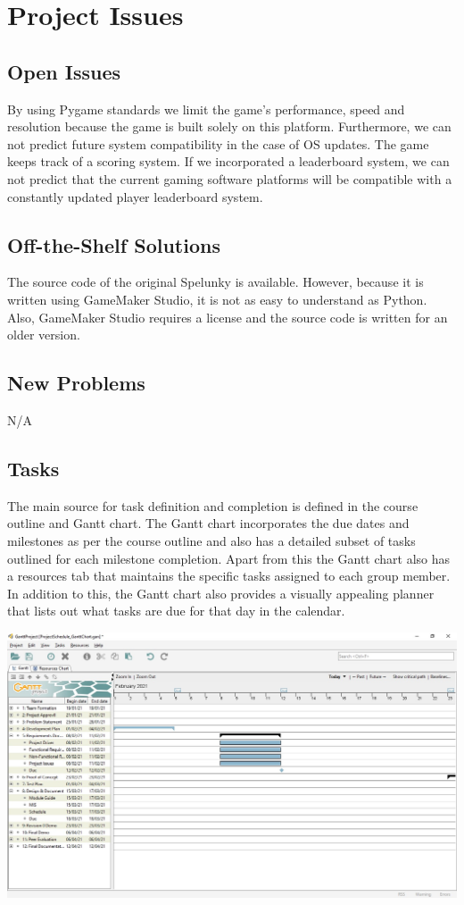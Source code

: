 \documentclass[12pt, titlepage]{article}
\begin{document}
\section{Project Issues}

\subsection{Open Issues}
By using Pygame standards we limit the game's performance, speed and resolution because the game is built solely on this platform. Furthermore, we can not predict future system compatibility in the case of OS updates. The game keeps track of a scoring system. If we incorporated a leaderboard system, we can not predict that the current gaming software platforms will be compatible with a constantly updated player leaderboard system.

\subsection{Off-the-Shelf Solutions}

The source code of the original Spelunky is available. However, because it is written using GameMaker Studio, it is not as easy to understand as Python. Also, GameMaker Studio requires a license and the source code is written for an older version.

\subsection{New Problems}
N/A

\subsection{Tasks}
The main source for task definition and completion is defined in the course outline and Gantt chart. The Gantt chart incorporates the due dates and milestones as per the course outline and also has a detailed subset of tasks outlined for each milestone completion. Apart from this the Gantt chart also has a resources tab that maintains the specific tasks assigned to each group member. In addition to this, the Gantt chart also provides a visually appealing planner that lists out what tasks are due for that day in the calendar. 

\begin{center}
    \includegraphics[scale=0.4]{Gantt1.jpg}
\end{center}
\end{document}
